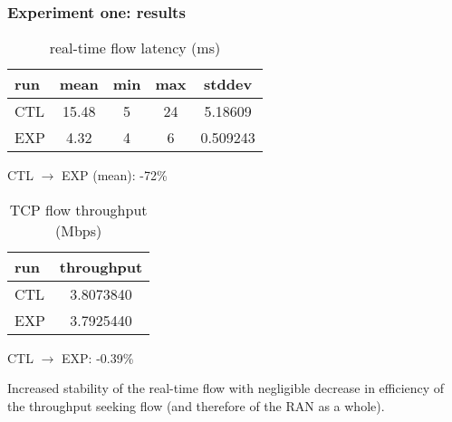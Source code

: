 \begin{frame}
\frametitle{Experiment one: results}

\begin{center}
  \begin{table}
    \begin{tabular}{l | c | c | c | c }
      run & mean & min & max & stddev \\
      \hline \hline
      CTL & 15.48 & 5 & 24 & 5.18609\\ 
      EXP & 4.32 & 4 & 6 & 0.509243\\
    \end{tabular}
    \caption{real-time flow latency (ms)}
  \end{table}
CTL $\rightarrow$ EXP (mean): -72\%
\end{center}


\begin{center}
  \begin{table}
    \begin{tabular}{l | c }
      run & throughput \\
      \hline \hline
      CTL & 3.8073840\\ 
      EXP & 3.7925440\\
    \end{tabular}
    \caption{TCP flow throughput (Mbps)}
  \end{table}
CTL $\rightarrow$ EXP: -0.39\%
\end{center}


Increased stability of the real-time flow with negligible decrease in efficiency of the throughput seeking flow (and therefore of the RAN as a whole).

\end{frame}
